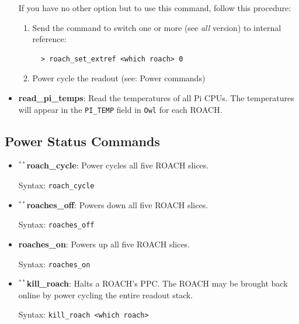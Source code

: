 \begin{itemize}[leftmargin=*,label={}]
If you have no other option but to use this command, follow this procedure:
\begin{enumerate}
  \item Send the command to switch one or more (see \textit{all} version) to internal reference:
\begin{verbatim}
  > roach_set_extref <which roach> 0
\end{verbatim}
  \item Power cycle the readout (see: Power commands)
\end{enumerate}

\item \textbf{read\_pi\_temps}: Read the temperatures of all Pi CPUs. The temperatures will appear in the \texttt{PI\_TEMP} field in \texttt{Owl} for each ROACH\@.

\end{itemize}

\subsection{Power Status Commands}

\begin{itemize}[leftmargin=*,label={}]

\item $^{**}$\textbf{roach\_cycle}: Power cycles all five ROACH slices.

Syntax: \texttt{roach\_cycle}

\item $^{**}$\textbf{roaches\_off}: Powers down all five ROACH slices.

Syntax: \texttt{roaches\_off}

\item \textbf{roaches\_on}: Powers up all five ROACH slices.

Syntax: \texttt{roaches\_on}

\item $^{**}$\textbf{kill\_roach}: Halts a ROACH’s PPC\@. The ROACH may be brought back online by power cycling the entire readout stack.

Syntax: \texttt{kill\_roach <which roach>}

\end{itemize}

